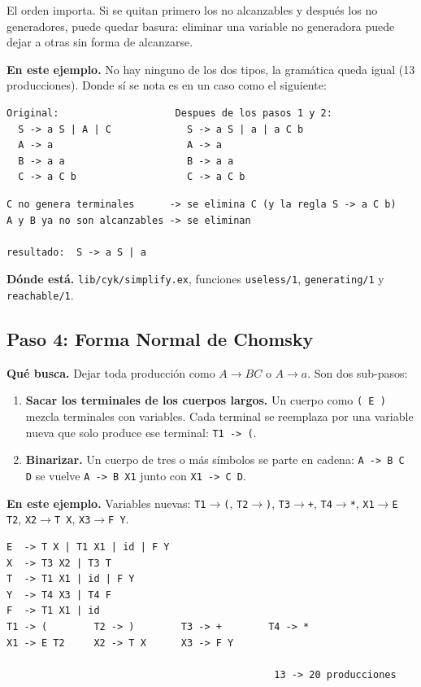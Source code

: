 \documentclass[11pt,a4paper]{article}
\newcommand{\gram}[1]{\texttt{#1}}
\begin{document}
El orden importa. Si se quitan primero los no alcanzables y después los no
generadores, puede quedar basura: eliminar una variable no generadora puede
dejar a otras sin forma de alcanzarse.

\textbf{En este ejemplo.} No hay ninguno de los dos tipos, la gramática queda
igual (13 producciones). Donde sí se nota es en un caso como el siguiente:

\begin{lstlisting}
Original:                    Despues de los pasos 1 y 2:
  S -> a S | A | C             S -> a S | a | a C b
  A -> a                       A -> a
  B -> a a                     B -> a a
  C -> a C b                   C -> a C b
\end{lstlisting}

\begin{lstlisting}
C no genera terminales      -> se elimina C (y la regla S -> a C b)
A y B ya no son alcanzables -> se eliminan

resultado:  S -> a S | a
\end{lstlisting}

\textbf{Dónde está.} \texttt{lib/cyk/simplify.ex}, funciones
\texttt{useless/1}, \texttt{generating/1} y \texttt{reachable/1}.

\subsection{Paso 4: Forma Normal de Chomsky}

\textbf{Qué busca.} Dejar toda producción como $A \to BC$ o $A \to a$. Son dos
sub-pasos:

\begin{enumerate}[leftmargin=*]
  \item \textbf{Sacar los terminales de los cuerpos largos.} Un cuerpo como
  \gram{( E )} mezcla terminales con variables. Cada terminal se reemplaza por
  una variable nueva que solo produce ese terminal: \gram{T1 -> (}.
  \item \textbf{Binarizar.} Un cuerpo de tres o más símbolos se parte en
  cadena: \gram{A -> B C D} se vuelve \gram{A -> B X1} junto con
  \gram{X1 -> C D}.
\end{enumerate}

\textbf{En este ejemplo.} Variables nuevas: \gram{T1}$\to$\gram{(},
\gram{T2}$\to$\gram{)}, \gram{T3}$\to$\gram{+}, \gram{T4}$\to$\gram{*},
\gram{X1}$\to$\gram{E T2}, \gram{X2}$\to$\gram{T X}, \gram{X3}$\to$\gram{F Y}.

\begin{lstlisting}
E  -> T X | T1 X1 | id | F Y
X  -> T3 X2 | T3 T
T  -> T1 X1 | id | F Y
Y  -> T4 X3 | T4 F
F  -> T1 X1 | id
T1 -> (        T2 -> )        T3 -> +        T4 -> *
X1 -> E T2     X2 -> T X      X3 -> F Y

                                              13 -> 20 producciones
\end{lstlisting}
\end{document}
